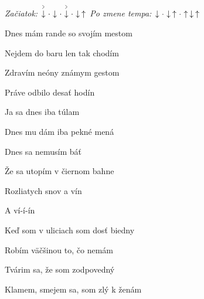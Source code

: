 \begin{song}


\begin{headerbox}
\RaiseBoxWithAccents
\textit{Začiatok:} $\AccentDown\Miss\Down\Miss\AccentDown\Miss\Down\Up$ \quad
\textit{Po zmene tempa:} $\Down\Miss\Down\Up\Miss\Up\Down\Up$ \quad
\end{headerbox}

\begin{chordbox}
\end{chordbox}

\large

\bigskip

 Dnes mám rande so svojím mestom \par
{} Nejdem do baru len tak chodím \par
{} Zdravím neóny známym gestom \par
{} Práve odbilo desať hodín \par

\bigskip

\begin{chorusbox}{\Refren}
 Ja sa dnes iba túlam \par
{} Dnes mu dám iba pekné mená \par
{} Dnes sa nemusím báť \par
{} Že sa utopím v čiernom bahne \par
{}Rozliatych snov  a vín  \par
A ví-í-ín  \par
\end{chorusbox}

\bigskip

 Keď som v uliciach som dosť biedny \par
{} Robím väčšinou to, čo nemám \par
{} Tvárim sa, že som zodpovedný \par
{} Klamem, smejem sa, som zlý k ženám \par

\bigskip

\Refren\  \par

\bigskip


\end{song}
